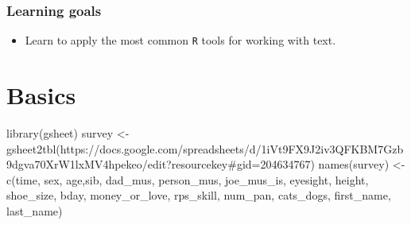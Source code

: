 \documentclass[
]{book}
\newenvironment{Shaded}{\begin{snugshade}}{\end{snugshade}}
\newcommand{\FunctionTok}[1]{\textcolor[rgb]{0.00,0.00,0.00}{#1}}
\newcommand{\NormalTok}[1]{#1}
\newcommand{\OtherTok}[1]{\textcolor[rgb]{0.56,0.35,0.01}{#1}}
\newcommand{\StringTok}[1]{\textcolor[rgb]{0.31,0.60,0.02}{#1}}
\providecommand{\tightlist}{%
  \setlength{\itemsep}{0pt}\setlength{\parskip}{0pt}}
\begin{document}
\hypertarget{learning-goals-18}{%
\subsubsection*{Learning goals}\label{learning-goals-18}}

\begin{itemize}
\tightlist
\item
  Learn to apply the most common \texttt{R} tools for working with text.
\end{itemize}

\hypertarget{basics-1}{%
\section*{Basics}\label{basics-1}}

\begin{Shaded}
\begin{Highlighting}[]
\FunctionTok{library}\NormalTok{(gsheet)}
\NormalTok{survey }\OtherTok{\textless{}{-}} \FunctionTok{gsheet2tbl}\NormalTok{(}\StringTok{\textquotesingle{}https://docs.google.com/spreadsheets/d/1iVt9FX9J2iv3QFKBM7Gzb9dgva70XrW1lxMV4hpekeo/edit?resourcekey\#gid=204634767\textquotesingle{}}\NormalTok{)}
\FunctionTok{names}\NormalTok{(survey) }\OtherTok{\textless{}{-}} \FunctionTok{c}\NormalTok{(}\StringTok{\textquotesingle{}time\textquotesingle{}}\NormalTok{, }\StringTok{\textquotesingle{}sex\textquotesingle{}}\NormalTok{, }\StringTok{\textquotesingle{}age\textquotesingle{}}\NormalTok{,}\StringTok{\textquotesingle{}sib\textquotesingle{}}\NormalTok{, }\StringTok{\textquotesingle{}dad\_mus\textquotesingle{}}\NormalTok{, }\StringTok{\textquotesingle{}person\_mus\textquotesingle{}}\NormalTok{, }\StringTok{\textquotesingle{}joe\_mus\_is\textquotesingle{}}\NormalTok{, }\StringTok{\textquotesingle{}eyesight\textquotesingle{}}\NormalTok{, }\StringTok{\textquotesingle{}height\textquotesingle{}}\NormalTok{, }\StringTok{\textquotesingle{}shoe\_size\textquotesingle{}}\NormalTok{, }\StringTok{\textquotesingle{}bday\textquotesingle{}}\NormalTok{, }\StringTok{\textquotesingle{}money\_or\_love\textquotesingle{}}\NormalTok{, }\StringTok{\textquotesingle{}rps\_skill\textquotesingle{}}\NormalTok{, }\StringTok{\textquotesingle{}num\_pan\textquotesingle{}}\NormalTok{, }\StringTok{\textquotesingle{}cats\_dogs\textquotesingle{}}\NormalTok{, }\StringTok{\textquotesingle{}first\_name\textquotesingle{}}\NormalTok{, }\StringTok{\textquotesingle{}last\_name\textquotesingle{}}\NormalTok{)}
\end{Highlighting}
\end{Shaded}
\end{document}

